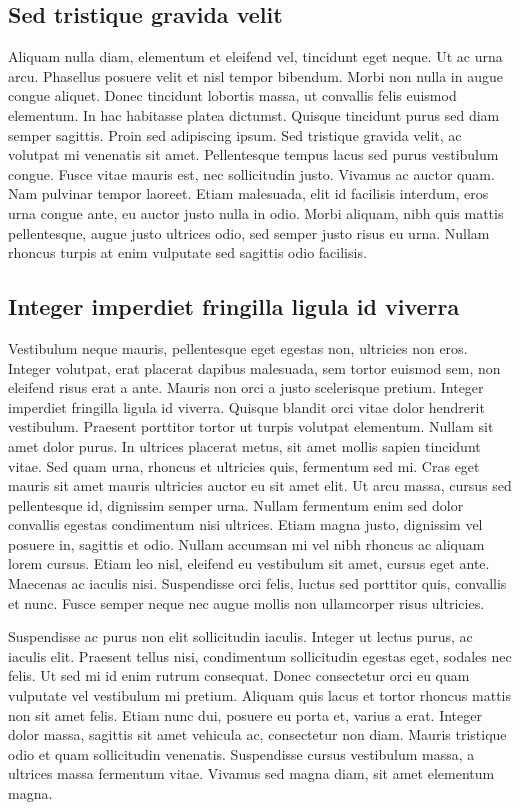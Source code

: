 \documentclass[11pt]{article}
\begin{document}
\subsection{Sed tristique gravida velit} %
Aliquam nulla diam, elementum et eleifend vel, tincidunt eget neque. Ut ac urna arcu. Phasellus posuere velit et nisl tempor bibendum. Morbi non nulla in augue congue aliquet. Donec tincidunt lobortis massa, ut convallis felis euismod elementum. In hac habitasse platea dictumst. Quisque tincidunt purus sed diam semper sagittis. Proin sed adipiscing ipsum. Sed tristique gravida velit, ac volutpat mi venenatis sit amet. Pellentesque tempus lacus sed purus vestibulum congue. Fusce vitae mauris est, nec sollicitudin justo. Vivamus ac auctor quam. Nam pulvinar tempor laoreet. Etiam malesuada, elit id facilisis interdum, eros urna congue ante, eu auctor justo nulla in odio. Morbi aliquam, nibh quis mattis pellentesque, augue justo ultrices odio, sed semper justo risus eu urna. Nullam rhoncus turpis at enim vulputate sed sagittis odio facilisis.

\subsection{Integer imperdiet fringilla ligula id viverra} %
Vestibulum neque mauris, pellentesque eget egestas non, ultricies non eros. Integer volutpat, erat placerat dapibus malesuada, sem tortor euismod sem, non eleifend risus erat a ante. Mauris non orci a justo scelerisque pretium. Integer imperdiet fringilla ligula id viverra. Quisque blandit orci vitae dolor hendrerit vestibulum. Praesent porttitor tortor ut turpis volutpat elementum. Nullam sit amet dolor purus. In ultrices placerat metus, sit amet mollis sapien tincidunt vitae. Sed quam urna, rhoncus et ultricies quis, fermentum sed mi. Cras eget mauris sit amet mauris ultricies auctor eu sit amet elit. Ut arcu massa, cursus sed pellentesque id, dignissim semper urna. Nullam fermentum enim sed dolor convallis egestas condimentum nisi ultrices. Etiam magna justo, dignissim vel posuere in, sagittis et odio. Nullam accumsan mi vel nibh rhoncus ac aliquam lorem cursus. Etiam leo nisl, eleifend eu vestibulum sit amet, cursus eget ante. Maecenas ac iaculis nisi. Suspendisse orci felis, luctus sed porttitor quis, convallis et nunc. Fusce semper neque nec augue mollis non ullamcorper risus ultricies.

Suspendisse ac purus non elit sollicitudin iaculis. Integer ut lectus purus, ac iaculis elit. Praesent tellus nisi, condimentum sollicitudin egestas eget, sodales nec felis. Ut sed mi id enim rutrum consequat. Donec consectetur orci eu quam vulputate vel vestibulum mi pretium. Aliquam quis lacus et tortor rhoncus mattis non sit amet felis. Etiam nunc dui, posuere eu porta et, varius a erat. Integer dolor massa, sagittis sit amet vehicula ac, consectetur non diam. Mauris tristique odio et quam sollicitudin venenatis. Suspendisse cursus vestibulum massa, a ultrices massa fermentum vitae. Vivamus sed magna diam, sit amet elementum magna.
\end{document}
